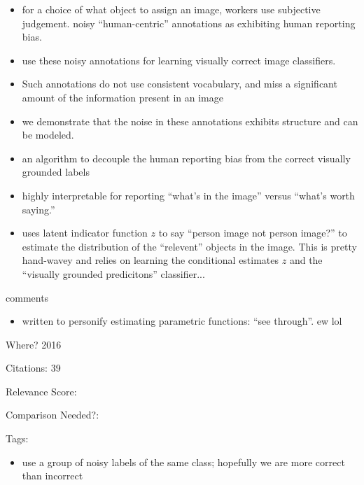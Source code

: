 \documentclass[11pt]{article}
\begin{document}
\begin{itemize}
\item for a choice of what object to assign an image, workers use subjective judgement. noisy “human-centric” annotations as exhibiting human reporting bias.
\item use these noisy annotations for learning visually correct image classifiers.
\item Such annotations do not use consistent vocabulary, and miss a significant amount of the information present in an image
\item we demonstrate that the noise in these annotations exhibits structure and can be modeled.
\item an algorithm to decouple the human reporting bias from the correct visually grounded labels
\item highly interpretable for reporting “what’s in the image” versus “what’s worth saying.”
\item uses latent indicator function $z$ to say ``person image not person image?'' to estimate the distribution of the ``relevent'' objects in the image. This is pretty hand-wavey and relies on learning the conditional estimates $z$ and the ``visually grounded predicitons'' classifier...
\end{itemize}

\noindent comments
\begin{itemize}
\item written to personify estimating parametric functions: ``see through''. ew lol
\end{itemize}

\vspace{2cm}

\noindent Where? 2016

\noindent Citations: 39

\noindent Relevance Score:

\noindent Comparison Needed?: 

\noindent Tags:

\begin{itemize}
\item use a group of noisy labels of the same class; hopefully we are more correct than incorrect
\end{itemize}

\vspace{2cm}
\end{document}
